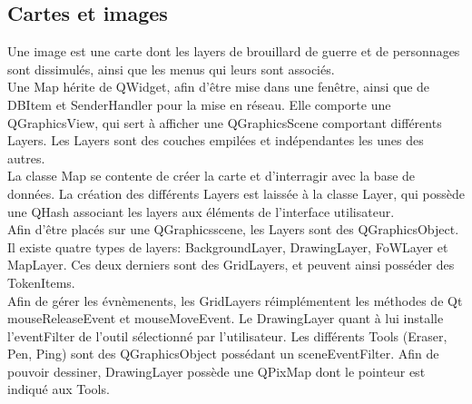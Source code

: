 \subsection{Cartes et images}

Une image est une carte dont les layers de brouillard de guerre et de personnages sont dissimulés, ainsi que les menus qui leurs sont associés.\\
Une Map hérite de QWidget, afin d'être mise dans une fenêtre, ainsi que de DBItem et SenderHandler pour la mise en réseau. Elle comporte une QGraphicsView, qui sert à afficher une QGraphicsScene comportant différents Layers. Les Layers sont des couches empilées et indépendantes les unes des autres.\\
La classe Map se contente de créer la carte et d'interragir avec la base de données. La création des différents Layers est laissée à la classe Layer, qui possède une QHash associant les layers aux éléments de l'interface utilisateur.\\
Afin d'être placés sur une QGraphicsscene, les Layers sont des QGraphicsObject. Il existe quatre types de layers: BackgroundLayer, DrawingLayer, FoWLayer et MapLayer. Ces deux derniers sont des GridLayers, et peuvent ainsi posséder des TokenItems.\\
Afin de gérer les évnèmenents, les GridLayers réimplémentent les méthodes de Qt mouseReleaseEvent et mouseMoveEvent. Le DrawingLayer quant à lui installe l'eventFilter de l'outil sélectionné par l'utilisateur. Les différents Tools (Eraser, Pen, Ping) sont des QGraphicsObject possédant un sceneEventFilter. Afin de pouvoir dessiner, DrawingLayer possède une QPixMap dont le pointeur est indiqué aux Tools.